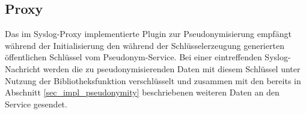 \subsection{Proxy}


Das im Syslog-Proxy implementierte Plugin zur Pseudonymisierung empfängt während der Initialisierung den während der Schlüsselerzeugung generierten öffentlichen Schlüssel vom Pseudonym-Service. Bei einer eintreffenden Syslog-Nachricht werden die zu pseudonymisierenden Daten mit diesem Schlüssel unter Nutzung der Bibliotheksfunktion verschlüsselt und zusammen mit den bereits in Abschnitt \ref{sec_impl_pseudonymity} beschriebenen weiteren Daten an den Service gesendet.